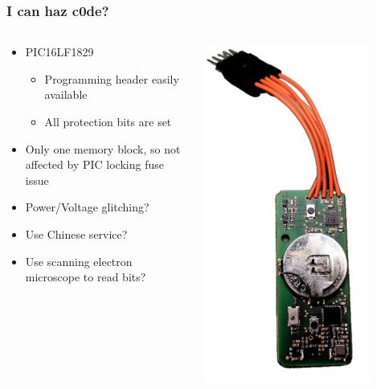 \documentclass[aspectratio=169]{beamer}
\begin{document}
\begin{frame}
	\frametitle{I can haz c0de?}

	\begin{columns}
		\begin{column}{0.7\textwidth}
			\begin{itemize}
				\item PIC16LF1829
					\begin{itemize}
						\item Programming header easily available
						\item All protection bits are set
					\end{itemize}
				\item Only one memory block, so not affected by PIC locking fuse issue
				\item Power/Voltage glitching?
				\item Use Chinese service?
				\item Use scanning electron microscope to read bits?
			\end{itemize}
		\end{column}
		\begin{column}{0.3\textwidth}
			\begin{center}
				\includegraphics[width=0.8\textwidth]{cff3000-programmer.png}

\end{center}
\end{column}
\end{columns}
\end{frame}
\end{document}
